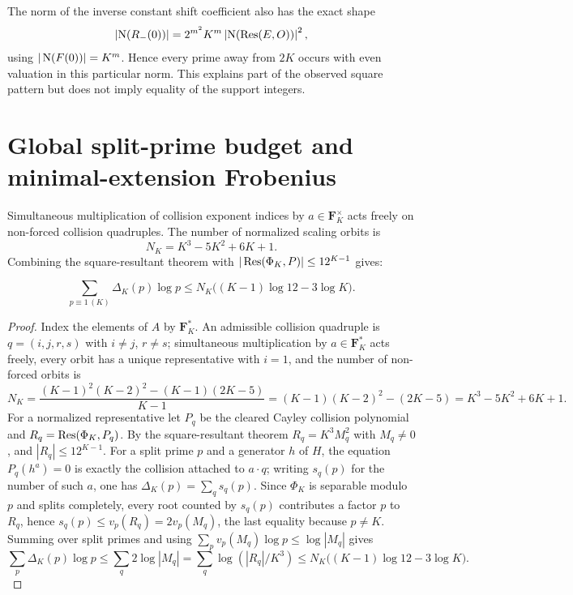 The norm of the inverse constant shift coefficient also has the exact shape
\begin{equation}\label{eq:inverse-norm}
\left|\operatorname{N}(R_-(0))\right|
 =2^{m^2}K^m\left|\operatorname{N}(\operatorname{Res}(E,O))\right|^2,
\end{equation}
using $|\operatorname{N}(F(0))|=K^m$.  Hence every prime away from $2K$ occurs with even
valuation in this particular norm.  This explains part of the observed square
pattern but does not imply equality of the support integers.

\section{Global split-prime budget and minimal-extension Frobenius}

Simultaneous multiplication of collision exponent indices by
$a\in\mathbf F_K^\times$ acts freely on non-forced collision quadruples.  The
number of normalized scaling orbits is
\[
N_K=K^3-5K^2+6K+1.
\]
Combining the square-resultant theorem with $|\operatorname{Res}(\Phi_K,P)|\le12^{K-1}$
gives:

\begin{theorem}\label{thm:budget}
\begin{equation}\label{eq:budget}
\sum_{p\equiv1\,(K)}\Delta_K(p)\log p
\le N_K\bigl((K-1)\log12-3\log K\bigr).
\end{equation}
\end{theorem}

\begin{proof}
Index the elements of $A$ by $\mathbf F_K^\ast$.  An admissible
collision quadruple is $q=(i,j,r,s)$ with $i\ne j$, $r\ne s$;
simultaneous multiplication by $a\in\mathbf F_K^\ast$ acts freely,
every orbit has a unique representative with $i=1$, and the number
of non-forced orbits is
\[
N_K=\frac{(K-1)^2(K-2)^2-(K-1)(2K-5)}{K-1}
   =(K-1)(K-2)^2-(2K-5)=K^3-5K^2+6K+1.
\]
For a normalized representative let $P_q$ be the cleared Cayley
collision polynomial and $R_q=\operatorname{Res}(\Phi_K,P_q)$.  By the
square-resultant theorem $R_q=K^3M_q^2$ with $M_q\ne0$, and
$|R_q|\le12^{K-1}$.  For a split prime $p$ and a generator $h$ of
$H$, the equation $P_q(h^a)=0$ is exactly the collision attached to
$a\cdot q$; writing $s_q(p)$ for the number of such $a$, one has
$\Delta_K(p)=\sum_q s_q(p)$.  Since $\Phi_K$ is separable modulo
$p$ and splits completely, every root counted by $s_q(p)$
contributes a factor $p$ to $R_q$, hence
$s_q(p)\le v_p(R_q)=2v_p(M_q)$, the last equality because $p\ne K$.
Summing over split primes and using
$\sum_p v_p(M_q)\log p\le\log|M_q|$ gives
\[
\sum_p\Delta_K(p)\log p
\le\sum_q2\log|M_q|
=\sum_q\log(|R_q|/K^3)
\le N_K\bigl((K-1)\log12-3\log K\bigr).
\]
\end{proof}

